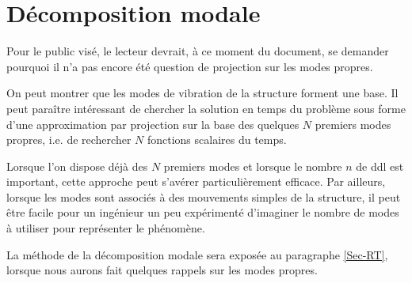 \bigskip
\section{Décomposition modale}

Pour le public visé, le lecteur devrait, à ce moment du document, se demander pourquoi
il n'a pas encore été question de projection sur les modes propres.

\medskip
On peut montrer que les modes de vibration de la structure forment une base. Il peut
paraître intéressant de chercher la solution en temps du problème sous forme d'une 
approximation par projection sur la base des quelques $N$ premiers modes propres, i.e.
de rechercher $N$ fonctions scalaires du temps.

Lorsque l'on dispose déjà des $N$ premiers modes et lorsque le nombre $n$ de ddl est important, 
cette approche peut s'avérer particulièrement efficace.
Par ailleurs, lorsque les modes sont associés à des mouvements simples de la structure, il
peut être facile pour un ingénieur un peu expérimenté d'imaginer le nombre de modes à 
utiliser pour représenter le phénomène. 

\medskip
La méthode de la décomposition modale sera exposée au paragraphe \ref{Sec-RT}, lorsque
nous aurons fait quelques rappels sur les modes propres.






